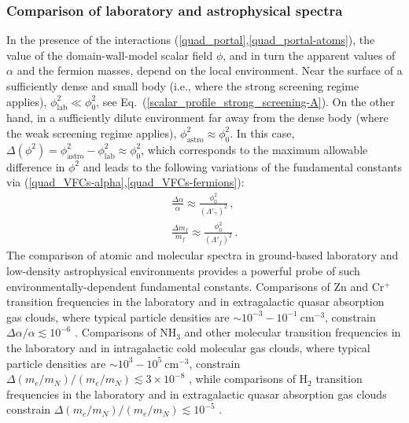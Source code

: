 \documentclass[aps,prd,onecolumn,nofootinbib]{revtex4-2} %
\begin{document}
\subsubsection{Comparison of laboratory and astrophysical spectra}
\label{Sec:Main_Lab-astro-spectra}
In the presence of the interactions (\ref{quad_portal},\ref{quad_portal-atoms}), the value of the domain-wall-model scalar field $\phi$, and in turn the apparent values of $\alpha$ and the fermion masses, depend on the local environment. 
Near the surface of a sufficiently dense and small body (i.e., where the strong screening regime applies), $\phi_\textrm{lab}^2 \ll \phi_0^2$, see Eq.~(\ref{scalar_profile_strong_screening-A}). 
On the other hand, in a sufficiently dilute environment far away from the dense body (where the weak screening regime applies), $\phi_\textrm{astro}^2 \approx \phi_0^2$. 
In this case, $\Delta (\phi^2) = \phi_\textrm{astro}^2 - \phi_\textrm{lab}^2 \approx \phi_0^2$, which corresponds to the maximum allowable difference in $\phi^2$ and leads to the following variations of the fundamental constants via (\ref{quad_VFCs-alpha},\ref{quad_VFCs-fermions}): 
\begin{gather}
\frac{\Delta \alpha}{\alpha} \approx \frac{\phi_0^2}{\left( \Lambda'_\gamma \right)^2}  \label{VFCs_low-high_density_enviros-cf_alpha}  \, ,  \\ 
\frac{\Delta m_f}{m_f} \approx \frac{\phi_0^2}{\left( \Lambda'_f \right)^2}  \label{VFCs_low-high_density_enviros-cf_fermions}  \, . 
\end{gather}
The comparison of atomic and molecular spectra in ground-based laboratory and low-density astrophysical environments provides a powerful probe of such environmentally-dependent fundamental constants. 
Comparisons of Zn and Cr$^+$ transition frequencies in the laboratory and in extragalactic quasar absorption gas clouds, where typical particle densities are $\sim 10^{-3} - 10^{-1}~\textrm{cm}^{-3}$, constrain $\Delta \alpha / \alpha \lesssim 10^{-6}$ \cite{Astrophys_alpha_limit_2016}. 
Comparisons of NH$_3$ and other molecular transition frequencies in the laboratory and in intragalactic cold molecular gas clouds, where typical particle densities are $\sim 10^3 - 10^5~\textrm{cm}^{-3}$, constrain $\Delta (m_e/m_N) / (m_e/m_N) \lesssim 3 \times 10^{-8}$ \cite{Astrophys_mu_limit_2010}, while comparisons of H$_2$ transition frequencies in the laboratory and in extragalactic quasar absorption gas clouds constrain $\Delta (m_e/m_N) / (m_e/m_N) \lesssim 10^{-5}$ \cite{Astrophys_mu_limit_2011,Astrophys_mu_limit_2015}. 
\end{document}
